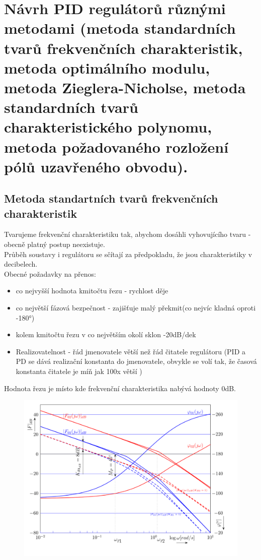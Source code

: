 \section{ Návrh PID regulátorů různými metodami (metoda standardních tvarů frekvenčních charakteristik, metoda optimálního
  modulu, metoda Zieglera-Nicholse, metoda standardních tvarů charakteristického polynomu, metoda požadovaného
  rozložení pólů uzavřeného obvodu).}

\subsection*{Metoda standartních tvarů frekvenčních charakteristik}

Tvarujeme frekvenční charakteristiku tak, abychom dosáhli vyhovujícího tvaru - obecně platný postup neexistuje.\\
Průběh soustavy i regulátoru se sčítají za předpokladu, že jsou charakteristiky v decibelech.\\
Obecné požadavky na přenos:
\begin{itemize}
    \item co nejvyšší hodnota kmitočtu řezu - rychlost děje
    \item co největší fázová bezpečnost - zajišťuje malý překmit(co nejvíc kladná oproti -180°)
    \item kolem kmitočtu řezu v co největším okolí sklon -20dB/dek
    \item Realizovatelnost - řád jmenovatele větší než řád čitatele regulátoru (PID a PD se dává realizační konstanta do jmenovatele, obvykle se volí tak, že časová konstanta čitatele je míň jak 100x větší )
\end{itemize}
Hodnota řezu je místo kde frekvenční charakteristika nabývá hodnoty 0dB.
\begin{figure}[H]
    \includegraphics*[scale = 0.8]{images/freqNavrh.png}
\end{figure}
\newpage

